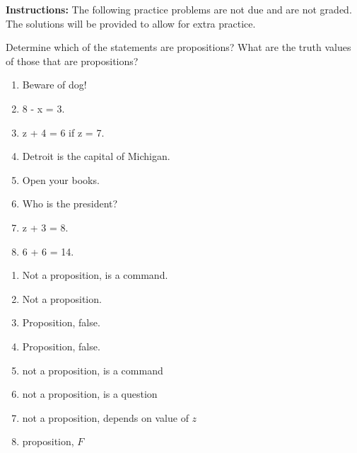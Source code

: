 \documentclass[12pt,addpoints]{exam}
\begin{document}
\extrawidth{0.5in} \extrafootheight{-0.0in} \pagestyle{headandfoot}
\headrule {} \footrule {}

\noindent \textbf{Instructions:} The following practice problems are
not due and are not graded.  The solutions will be provided to allow
for extra practice.

\begin{questions}
\printanswers

\question Determine which of the statements are propositions? What are the truth values of those that are propositions?
    \begin{enumerate}[label=(\alph*),itemsep=0pt,parsep=0pt,topsep=0pt,partopsep=0pt]
    \item Beware of dog!
    \item  8 - x = 3.
    \item  z + 4 = 6 if z = 7.
    \item Detroit is the capital of Michigan.
    \item Open your books.
    \item Who is the president?
    \item z + 3 = 8.
    \item 6 + 6 = 14.
    \end{enumerate}
    \ifprintanswers
        \vspace{-15pt}
    \fi
    \begin{solution}
        \begin{enumerate}[label=(\alph*),itemsep=0pt,parsep=0pt,topsep=0pt,partopsep=0pt]
        \item Not a proposition, is a command.
        \item Not a proposition.
        \item Proposition, false.
        \item Proposition, false.
        \item not a proposition, is a command
        \item not a proposition, is a question
        \item not a proposition, depends on value of $z$
        \item proposition, $F$
        \end{enumerate}
    \end{solution}


\end{questions}
\end{document}
